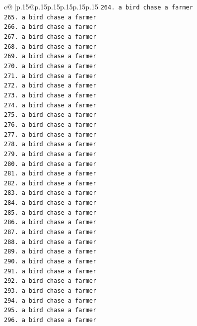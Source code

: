 \documentclass{article}
\begin{document}
{\begin{supertabular}{c@{$\;$}|p{.15\linewidth}@{}p{.15\linewidth}p{.15\linewidth}p{.15\linewidth}p{.15\linewidth}p{.15\linewidth}}
{{{\texttt{264. a bird chase a farmer} \\
\texttt{265. a bird chase a farmer} \\
\texttt{266. a bird chase a farmer} \\
\texttt{267. a bird chase a farmer} \\
\texttt{268. a bird chase a farmer} \\
\texttt{269. a bird chase a farmer} \\
\texttt{270. a bird chase a farmer} \\
\texttt{271. a bird chase a farmer} \\
\texttt{272. a bird chase a farmer} \\
\texttt{273. a bird chase a farmer} \\
\texttt{274. a bird chase a farmer} \\
\texttt{275. a bird chase a farmer} \\
\texttt{276. a bird chase a farmer} \\
\texttt{277. a bird chase a farmer} \\
\texttt{278. a bird chase a farmer} \\
\texttt{279. a bird chase a farmer} \\
\texttt{280. a bird chase a farmer} \\
\texttt{281. a bird chase a farmer} \\
\texttt{282. a bird chase a farmer} \\
\texttt{283. a bird chase a farmer} \\
\texttt{284. a bird chase a farmer} \\
\texttt{285. a bird chase a farmer} \\
\texttt{286. a bird chase a farmer} \\
\texttt{287. a bird chase a farmer} \\
\texttt{288. a bird chase a farmer} \\
\texttt{289. a bird chase a farmer} \\
\texttt{290. a bird chase a farmer} \\
\texttt{291. a bird chase a farmer} \\
\texttt{292. a bird chase a farmer} \\
\texttt{293. a bird chase a farmer} \\
\texttt{294. a bird chase a farmer} \\
\texttt{295. a bird chase a farmer} \\
\texttt{296. a bird chase a farmer} \\
}}}
\end{supertabular}}
\end{document}
